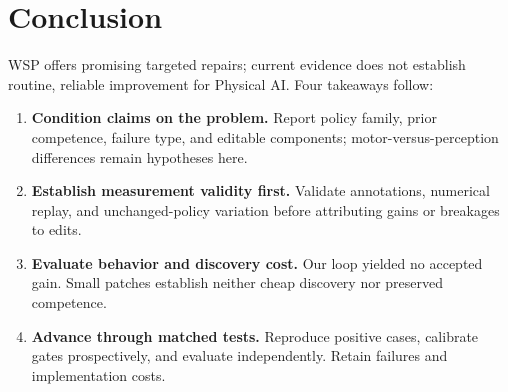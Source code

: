 \section{Conclusion}
WSP offers promising targeted repairs; current evidence does not establish routine, reliable improvement for Physical AI. Four takeaways follow:
\begin{enumerate}[label=(\arabic*)]
\item \textbf{Condition claims on the problem.} Report policy family, prior competence, failure type, and editable components; motor-versus-perception differences remain hypotheses here.
\item \textbf{Establish measurement validity first.} Validate annotations, numerical replay, and unchanged-policy variation before attributing gains or breakages to edits.
\item \textbf{Evaluate behavior and discovery cost.} Our loop yielded no accepted gain. Small patches establish neither cheap discovery nor preserved competence.
\item \textbf{Advance through matched tests.} Reproduce positive cases, calibrate gates prospectively, and evaluate independently. Retain failures and implementation costs.
\end{enumerate}
